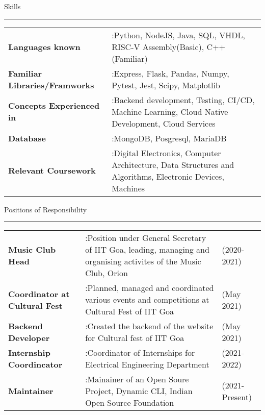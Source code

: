 \documentclass[10pt, hidelinks]{article}
\begin{document}

	{\large\color{RoyalBlue}Skills}
	\par\noindent\rule[7pt]{\textwidth}{0.1pt}
	\begin{center}
		{\small \vspace*{-5mm}
		\begin{tabular}{ m{} m{}}
			\textbf{Languages known} & :Python, NodeJS, Java, SQL, VHDL, RISC-V Assembly(Basic), C++(Familiar) \\
			\textbf{Familiar Libraries/Framworks} & :Express, Flask, Pandas, Numpy, Pytest, Jest, Scipy, Matplotlib \\
			\textbf{Concepts Experienced in} & :Backend development, Testing, CI/CD, Machine Learning, Cloud Native Development, Cloud Services \\
			\textbf{Database} & :MongoDB, Posgresql, MariaDB \\
			\textbf{Relevant Coursework} & :Digital Electronics, Computer Architecture, Data Structures and Algorithms, Electronic Devices, Machines \\
		\end{tabular}
		}
	\end{center}


	{\large\color{RoyalBlue}Positions of Responsibility}
	\par\noindent\rule[7pt]{\textwidth}{0.1pt}
	\begin{center}
		{\small \vspace*{-5mm}
		\begin{tabular}{ m{} m{} m{}}
			\textbf{Music Club Head} & :Position under General Secretary of IIT Goa, leading, managing and organising activites of the Music Club, Orion & (2020-2021) \\
			\textbf{Coordinator at Cultural Fest} & :Planned, managed and coordinated various events and competitions at Cultural Fest of IIT Goa & (May 2021) \\
			\textbf{Backend Developer} & :Created the backend of the website for Cultural fest of IIT Goa & (May 2021) \\
			\textbf{Internship Coordincator} & :Coordinator of Internships for Electrical Engineering Department & (2021-2022) \\
			\textbf{Maintainer} & :Mainainer of an Open Soure Project, Dynamic CLI, Indian Open Source Foundation & (2021-Present) \\
		\end{tabular}
		}
	\end{center}
\end{document}
